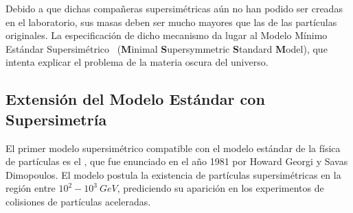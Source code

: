 Debido a que dichas compañeras supersimétricas aún no han podido ser creadas en el laboratorio, sus masas deben ser mucho mayores que las de las partículas originales. %
La especificación de dicho mecanismo da lugar al Modelo Mínimo Estándar Supersimétrico \MSSM~(\textbf{M}inimal \textbf{S}upersymmetric \textbf{S}tandard \textbf{M}odel), que intenta explicar el problema de la materia oscura del universo.




\subsection{Extensión del Modelo Estándar con Supersimetría}
 




El primer modelo supersimétrico compatible con el modelo estándar de la física de partículas es el \MSSM, que fue enunciado en el año 1981 por Howard Georgi y Savas Dimopoulos. El modelo postula la existencia de partículas supersimétricas en la región entre $10^2-10^3~GeV$, prediciendo su aparición en los experimentos de colisiones de partículas aceleradas. %

